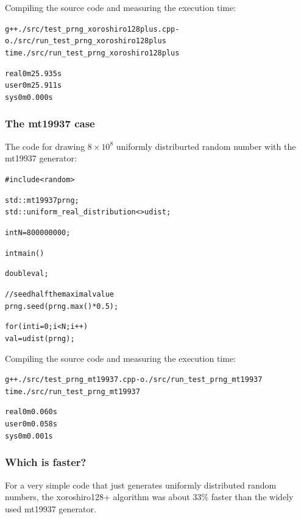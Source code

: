 \documentclass[11pt]{scrartcl}
\renewenvironment{verbatim}{\begin{alltt} \scriptsize \color{Bittersweet} \vspace{0.2cm} }{\vspace{0.2cm} \end{alltt} \normalsize \color{black}}
\begin{document}
Compiling the source code and measuring the execution time:

\begin{verbatim}
g++ ./src/test_prng_xoroshiro128plus.cpp -o ./src/run_test_prng_xoroshiro128plus
time ./src/run_test_prng_xoroshiro128plus
\end{verbatim}

\begin{verbatim}

real	0m25.935s
user	0m25.911s
sys	0m0.000s
\end{verbatim}


\subsubsection{The mt19937 case}
\label{sec:org4f6ce2d}

The code for drawing \(8\times 10^8\) uniformly distriburted random number with the mt19937 generator:

\begin{verbatim}
#include <random>

std::mt19937 prng;
std::uniform_real_distribution<> udist;

int N=800000000;

int main() {
  double val;

  // seed half the maximal value
  prng.seed(prng.max()*0.5);

  for (int i=0; i<N; i++) {
    val = udist(prng);
  }
}
\end{verbatim}

Compiling the source code and measuring the execution time:

\begin{verbatim}
g++ ./src/test_prng_mt19937.cpp -o ./src/run_test_prng_mt19937
time ./src/run_test_prng_mt19937
\end{verbatim}

\begin{verbatim}

real	0m0.060s
user	0m0.058s
sys	0m0.001s
\end{verbatim}

\subsubsection{Which is faster?}
\label{sec:orgf4dba14}

For a very simple code that just generates uniformly distributed random numbers, the xoroshiro128+ algorithm was about 33\% faster than the widely used mt19937 generator.
\end{document}
